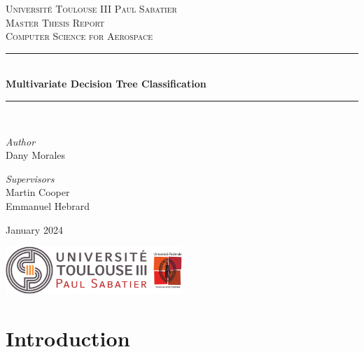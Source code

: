 \documentclass[12pt]{report}
\theoremstyle{definition}
\theoremstyle{definition}
\theoremstyle{definition}
\begin{document}
\begin{titlepage}
    \newcommand{\HRule}{\rule{\linewidth}{0.5mm}} %
    \center
    \textsc{\LARGE Université Toulouse III Paul Sabatier}\\[2.5cm]
    \textsc{\Large Master Thesis Report}\\[0.5cm]
    \textsc{\large Computer Science for Aerospace}\\[2.5cm]

    \HRule\\[0.5cm]
    {\huge \bf Multivariate Decision Tree Classification}\\[0.5cm]
    \HRule\\[1.5cm]

    \begin{minipage}{0.4\textwidth}
		\begin{flushleft}
			\large
			\textit{Author}\\
			Dany Morales
		\end{flushleft}
	\end{minipage}
    \begin{minipage}{0.4\textwidth}
		\begin{flushright}
			\large
			\textit{Supervisors}\\
			Martin Cooper\\
            Emmanuel Hebrard
		\end{flushright}
	\end{minipage}

    \vfill
    \large January 2024

    \includegraphics[width=0.5\textwidth]{logo.png}
\end{titlepage}



\tableofcontents



\chapter*{Introduction}
\end{document}

